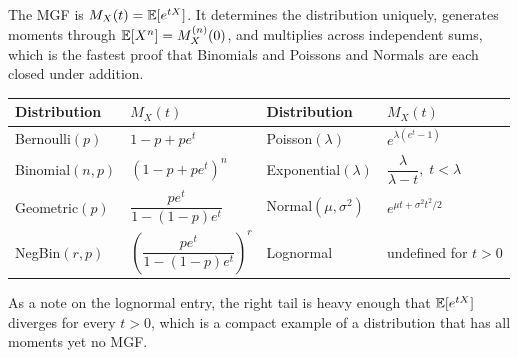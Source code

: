 \begin{keybox}
The MGF is $M_X(t) = \mathbb{E}[e^{tX}]$. It determines the distribution uniquely, generates moments through $\mathbb{E}[X^n] = M_X^{(n)}(0)$, and multiplies across independent sums, which is the fastest proof that Binomials and Poissons and Normals are each closed under addition.

\vspace{2ex}

\begin{center}
\begin{tabular}{@{}ll@{\hskip 3em}ll@{}}
\toprule
\textbf{Distribution} & $M_X(t)$ & \textbf{Distribution} & $M_X(t)$ \\
\midrule
Bernoulli$(p)$ & $1-p+pe^t$ & Poisson$(\lambda)$ & $e^{\lambda(e^t-1)}$ \\[0.4em]
Binomial$(n,p)$ & $(1-p+pe^t)^n$ & Exponential$(\lambda)$ & $\dfrac{\lambda}{\lambda-t}, \; t<\lambda$ \\[0.5em]
Geometric$(p)$ & $\dfrac{pe^t}{1-(1-p)e^t}$ & Normal$(\mu,\sigma^2)$ & $e^{\mu t + \sigma^2 t^2/2}$ \\[0.5em]
NegBin$(r,p)$ & $\left(\dfrac{pe^t}{1-(1-p)e^t}\right)^{\!r}$ & Lognormal & undefined for $t>0$ \\
\bottomrule
\end{tabular}
\end{center}

\vspace{1ex}

As a note on the lognormal entry, the right tail is heavy enough that $\mathbb{E}[e^{tX}]$ diverges for every $t > 0$, which is a compact example of a distribution that has all moments yet no MGF.
\end{keybox}

\vspace{2ex}

